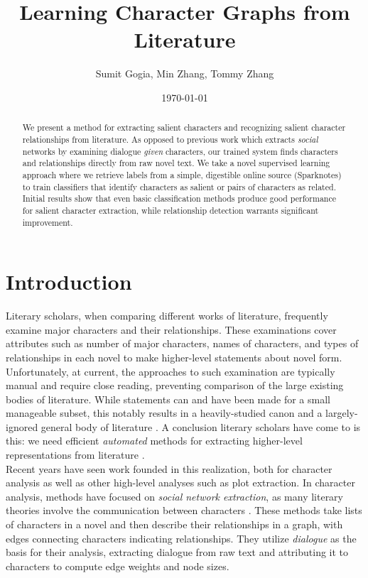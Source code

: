 \documentclass[12pt]{article}
\begin{document}
\title{Learning Character Graphs from Literature}
\author{Sumit Gogia, Min Zhang, Tommy Zhang}
\date{\today}

\maketitle

\begin{abstract}

We present a method for extracting salient characters and recognizing salient character relationships from literature. As opposed to previous work which extracts \emph{social} networks by examining dialogue \emph{given} characters, our trained system finds characters and relationships directly from raw novel text. We take a novel supervised learning approach where we retrieve labels from a simple, digestible online source (Sparknotes) to train classifiers that identify characters as salient or pairs of characters as related. Initial results show that even basic classification methods produce good performance for salient character extraction, while relationship detection warrants significant improvement. 

\end{abstract}

\section{Introduction}

Literary scholars, when comparing different works of literature, frequently examine major characters and their relationships. These examinations cover attributes such as number of major characters, names of characters, and types of relationships in each novel to make higher-level statements about novel form. \\

Unfortunately, at current, the approaches to such examination are typically manual and require close reading, preventing comparison of the large existing bodies of literature. While statements can and have been made for a small manageable subset, this notably results in a heavily-studied canon and a largely-ignored general body of literature \cite{moretti2013distant}. A conclusion literary scholars have come to is this: we need efficient \emph{automated} methods for extracting higher-level representations from literature \cite{moretti2005graphs}. \\

Recent years have seen work founded in this realization, both for character analysis as well as other high-level analyses such as plot extraction. In character analysis, methods have focused on \emph{social network extraction}, as many literary theories involve the communication between characters \cite{moretti1999atlas, bakhtin1937forms, williams1975country}. These methods take lists of characters in a novel and then describe their relationships in a graph, with edges connecting characters indicating relationships. They utilize \emph{dialogue} as the basis for their analysis, extracting dialogue from raw text and attributing it to characters to compute edge weights and node sizes. \\
\end{document}

